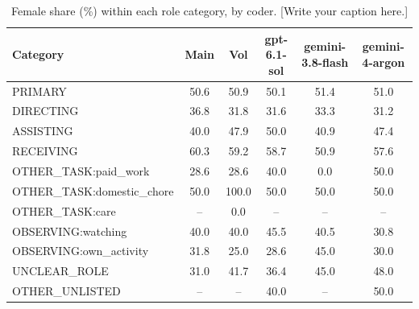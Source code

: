 \begin{table}[t]
\centering
\scriptsize

\begin{tabular}{@{}lccccc@{}}
\toprule
Category & \textbf{Main} & \textbf{Vol} & \textbf{gpt-6.1-sol} & \textbf{gemini-3.8-flash} & \textbf{gemini-4-argon} \\
\midrule
PRIMARY & 50.6 & 50.9 & 50.1 & 51.4 & 51.0 \\
DIRECTING & 36.8 & 31.8 & 31.6 & 33.3 & 31.2 \\
ASSISTING & 40.0 & 47.9 & 50.0 & 40.9 & 47.4 \\
RECEIVING & 60.3 & 59.2 & 58.7 & 50.9 & 57.6 \\
OTHER\_TASK:paid\_work & 28.6 & 28.6 & 40.0 & 0.0 & 50.0 \\
OTHER\_TASK:domestic\_chore & 50.0 & 100.0 & 50.0 & 50.0 & 50.0 \\
OTHER\_TASK:care & -- & 0.0 & -- & -- & -- \\
OBSERVING:watching & 40.0 & 40.0 & 45.5 & 40.5 & 30.8 \\
OBSERVING:own\_activity & 31.8 & 25.0 & 28.6 & 45.0 & 30.0 \\
UNCLEAR\_ROLE & 31.0 & 41.7 & 36.4 & 45.0 & 48.0 \\
OTHER\_UNLISTED & -- & -- & 40.0 & -- & 50.0 \\
\bottomrule
\end{tabular}
\caption{Female share (\%) within each role category, by coder. [Write your caption here.]}
\label{tab:category-shares}
\end{table}
